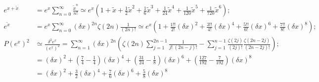 \documentclass[twoside]{article}
\numberwithin{equation}{section}
\begin{document}
\fi

\iffalse

\begin{align*}
e^{x + \tilde{x}} &= e^x \sum_{n=0}^{\infty} \frac{\tilde{x}^n}{n!}
 \simeq e^x \left(1 + \tilde{x} + \frac{1}{2} \tilde{x}^2 + \frac{1}{6} \tilde{x}^3 + \frac{1}{24} \tilde{x}^4 + \frac{1}{120} \tilde{x}^5 + \frac{1}{720} \tilde{x}^6 \right); \\
\overline{e^x} &= e^x \sum_{n=0}^{\infty} (\delta x)^{2n} \zeta(2n) \frac{1}{(2n)!} 
 \simeq e^x \left(1 + \frac{1!!}{2!} (\delta x)^2 + \frac{3!!}{4!} (\delta x)^4 + \frac{5!!}{6!} (\delta x)^6 + \frac{7!!}{8!} (\delta x)^8 \right); \\
P(e^x)^2 &\simeq \frac{\delta^2 e^x}{(e^x)^2} =  \sum_{n=1}^{\infty} (\delta x)^{2n} \left( \zeta(2n) \sum_{j=1}^{2n-1} \frac{1}{j!\;(2n - j)!} 
   	- \sum_{j=1}^{n-1} \frac{\zeta(2j)}{(2j)!}  \frac{\zeta(2n - 2j)}{(2n - 2j)!} \right); \\
 &= (\delta x)^2 + (\frac{7}{4} - \frac{1}{4}) (\delta x)^4 + (\frac{31}{24} - \frac{1}{8}) (\delta x)^6
  + (\frac{127}{192} - \frac{7}{192}) (\delta x)^8 \\
 &= (\delta x)^2 + \frac{3}{2} (\delta x)^4 + \frac{7}{6} (\delta x)^6 + \frac{5}{8} (\delta x)^8
\end{align*}
\end{document}
